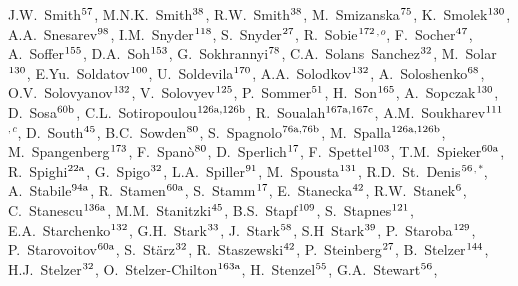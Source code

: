 \begin{flushleft}
J.W.~Smith$^\textrm{\scriptsize 57}$,
M.N.K.~Smith$^\textrm{\scriptsize 38}$,
R.W.~Smith$^\textrm{\scriptsize 38}$,
M.~Smizanska$^\textrm{\scriptsize 75}$,
K.~Smolek$^\textrm{\scriptsize 130}$,
A.A.~Snesarev$^\textrm{\scriptsize 98}$,
I.M.~Snyder$^\textrm{\scriptsize 118}$,
S.~Snyder$^\textrm{\scriptsize 27}$,
R.~Sobie$^\textrm{\scriptsize 172}$$^{,o}$,
F.~Socher$^\textrm{\scriptsize 47}$,
A.~Soffer$^\textrm{\scriptsize 155}$,
D.A.~Soh$^\textrm{\scriptsize 153}$,
G.~Sokhrannyi$^\textrm{\scriptsize 78}$,
C.A.~Solans~Sanchez$^\textrm{\scriptsize 32}$,
M.~Solar$^\textrm{\scriptsize 130}$,
E.Yu.~Soldatov$^\textrm{\scriptsize 100}$,
U.~Soldevila$^\textrm{\scriptsize 170}$,
A.A.~Solodkov$^\textrm{\scriptsize 132}$,
A.~Soloshenko$^\textrm{\scriptsize 68}$,
O.V.~Solovyanov$^\textrm{\scriptsize 132}$,
V.~Solovyev$^\textrm{\scriptsize 125}$,
P.~Sommer$^\textrm{\scriptsize 51}$,
H.~Son$^\textrm{\scriptsize 165}$,
A.~Sopczak$^\textrm{\scriptsize 130}$,
D.~Sosa$^\textrm{\scriptsize 60b}$,
C.L.~Sotiropoulou$^\textrm{\scriptsize 126a,126b}$,
R.~Soualah$^\textrm{\scriptsize 167a,167c}$,
A.M.~Soukharev$^\textrm{\scriptsize 111}$$^{,c}$,
D.~South$^\textrm{\scriptsize 45}$,
B.C.~Sowden$^\textrm{\scriptsize 80}$,
S.~Spagnolo$^\textrm{\scriptsize 76a,76b}$,
M.~Spalla$^\textrm{\scriptsize 126a,126b}$,
M.~Spangenberg$^\textrm{\scriptsize 173}$,
F.~Span\`o$^\textrm{\scriptsize 80}$,
D.~Sperlich$^\textrm{\scriptsize 17}$,
F.~Spettel$^\textrm{\scriptsize 103}$,
T.M.~Spieker$^\textrm{\scriptsize 60a}$,
R.~Spighi$^\textrm{\scriptsize 22a}$,
G.~Spigo$^\textrm{\scriptsize 32}$,
L.A.~Spiller$^\textrm{\scriptsize 91}$,
M.~Spousta$^\textrm{\scriptsize 131}$,
R.D.~St.~Denis$^\textrm{\scriptsize 56}$$^{,*}$,
A.~Stabile$^\textrm{\scriptsize 94a}$,
R.~Stamen$^\textrm{\scriptsize 60a}$,
S.~Stamm$^\textrm{\scriptsize 17}$,
E.~Stanecka$^\textrm{\scriptsize 42}$,
R.W.~Stanek$^\textrm{\scriptsize 6}$,
C.~Stanescu$^\textrm{\scriptsize 136a}$,
M.M.~Stanitzki$^\textrm{\scriptsize 45}$,
B.S.~Stapf$^\textrm{\scriptsize 109}$,
S.~Stapnes$^\textrm{\scriptsize 121}$,
E.A.~Starchenko$^\textrm{\scriptsize 132}$,
G.H.~Stark$^\textrm{\scriptsize 33}$,
J.~Stark$^\textrm{\scriptsize 58}$,
S.H~Stark$^\textrm{\scriptsize 39}$,
P.~Staroba$^\textrm{\scriptsize 129}$,
P.~Starovoitov$^\textrm{\scriptsize 60a}$,
S.~St\"arz$^\textrm{\scriptsize 32}$,
R.~Staszewski$^\textrm{\scriptsize 42}$,
P.~Steinberg$^\textrm{\scriptsize 27}$,
B.~Stelzer$^\textrm{\scriptsize 144}$,
H.J.~Stelzer$^\textrm{\scriptsize 32}$,
O.~Stelzer-Chilton$^\textrm{\scriptsize 163a}$,
H.~Stenzel$^\textrm{\scriptsize 55}$,
G.A.~Stewart$^\textrm{\scriptsize 56}$,
$$
\end{flushleft}
